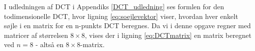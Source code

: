 I udledningen af DCT i Appendiks \vref{DCT_udledning} ses formlen for den todimensionelle DCT, hvor ligning \vref{eq:soejlevektor} viser, hvordan hver enkelt søjle i en matrix for en n-punkts DCT beregnes. Da vi i denne opgave regner med matricer af størrelsen $8\times8$, vises der i ligning \ref{eq:DCTmatrix} en matrix beregnet ved $n=8$ - altså en $8\times8$-matrix.
